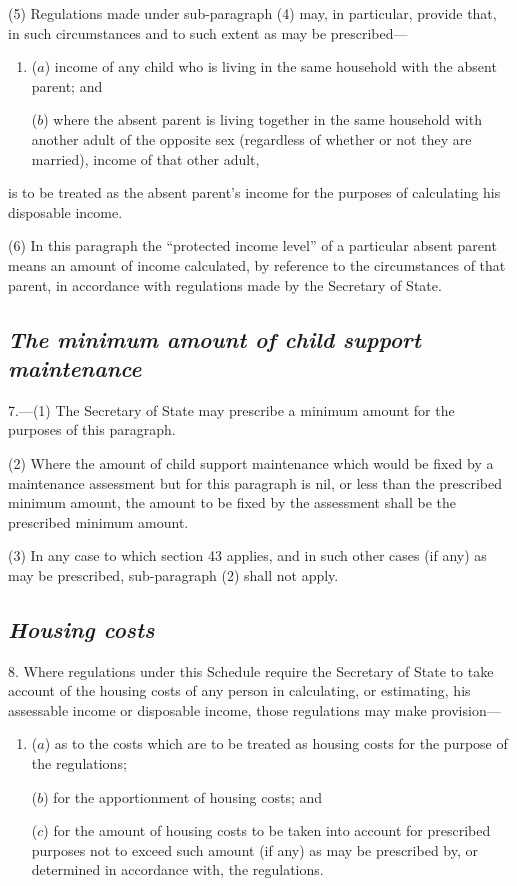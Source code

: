 \documentclass[12pt,a4paper]{article}
\begin{document}
(5) Regulations made under sub-paragraph (4)  may, in particular, provide that, in such circumstances and to such extent as may be prescribed—
\begin{enumerate}\item[]
($a$) income of any child who is living in the same household with the absent parent; and

($b$) where the absent parent is living together in the same household with another adult of the opposite sex (regardless of whether or not they are married), income of that other adult,
\end{enumerate}
is to be treated as the absent parent’s income for the purposes of calculating his disposable income.

(6) In this paragraph the “protected income level” of a particular absent parent means an amount of income calculated, by reference to the circumstances of that parent, in accordance with regulations made by the Secretary of State.


\subsection*{\itshape The minimum amount of child support maintenance}

7.---(1) The Secretary of State may prescribe a minimum amount for the purposes of this paragraph.

(2) Where the amount of child support maintenance which would be fixed by a maintenance assessment but for this paragraph is nil, or less than the prescribed minimum amount, the amount to be fixed by the assessment shall be the prescribed minimum amount.

(3) In any case to which section 43 applies, and in such other cases (if any) as may be prescribed, sub-paragraph (2)  shall not apply.

\subsection*{\itshape Housing costs}

8. Where regulations under this Schedule require 
the Secretary of State  %
to take account of the housing costs of any person in calculating, or estimating, his assessable income or disposable income, those regulations may make provision—
\begin{enumerate}\item[]
($a$) as to the costs which are to be treated as housing costs for the purpose of the regulations;

($b$) for the apportionment of housing costs; and

($c$) for the amount of housing costs to be taken into account for prescribed purposes not to exceed such amount (if any) as may be prescribed by, or determined in accordance with, the regulations.
\end{enumerate}
\end{document}
